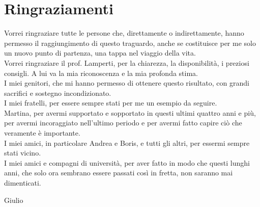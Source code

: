 \chapter*{Ringraziamenti}
Vorrei ringraziare tutte le persone che, direttamente o indirettamente, hanno permesso il raggiungimento di questo traguardo, anche se costituisce per me solo un nuovo punto di partenza, una tappa nel viaggio della vita.\\
Vorrei ringraziare il prof. Lamperti, per la chiarezza, la disponibilità, i preziosi consigli. A lui va la mia riconoscenza e la mia profonda stima.\\
I miei genitori, che mi hanno permesso di ottenere questo risultato, con grandi sacrifici e sostegno incondizionato.\\ 
I miei fratelli, per essere sempre stati per me un esempio da seguire.\\
Martina, per avermi supportato e sopportato in questi ultimi quattro anni e più, per avermi incoraggiato nell'ultimo periodo e per avermi fatto capire ciò che veramente è importante.\\
I miei amici, in particolare Andrea e Boris, e tutti gli altri, per essermi sempre stati vicino.\\
I miei amici e compagni di università, per aver fatto in modo che questi lunghi anni, che solo ora sembrano essere passati così in fretta, non saranno mai dimenticati. 

\begin{flushright}Giulio\end{flushright}